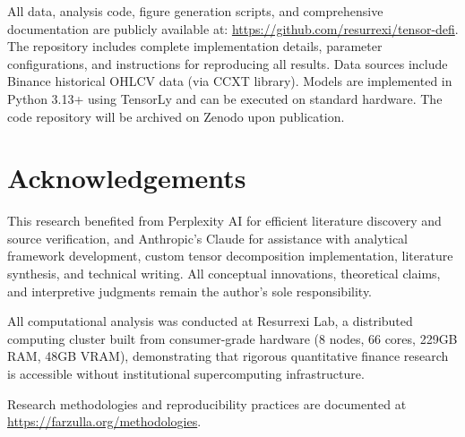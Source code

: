 \documentclass[11pt,twocolumn]{article}
\begin{document}
All data, analysis code, figure generation scripts, and comprehensive documentation are publicly available at: \url{https://github.com/resurrexi/tensor-defi}. The repository includes complete implementation details, parameter configurations, and instructions for reproducing all results. Data sources include Binance historical OHLCV data (via CCXT library). Models are implemented in Python 3.13+ using TensorLy and can be executed on standard hardware. The code repository will be archived on Zenodo upon publication.

\section*{Acknowledgements}

This research benefited from Perplexity AI for efficient literature discovery and source verification, and Anthropic's Claude for assistance with analytical framework development, custom tensor decomposition implementation, literature synthesis, and technical writing. All conceptual innovations, theoretical claims, and interpretive judgments remain the author's sole responsibility.

All computational analysis was conducted at Resurrexi Lab, a distributed computing cluster built from consumer-grade hardware (8 nodes, 66 cores, 229GB RAM, 48GB VRAM), demonstrating that rigorous quantitative finance research is accessible without institutional supercomputing infrastructure.

Research methodologies and reproducibility practices are documented at \url{https://farzulla.org/methodologies}.


\end{document}
